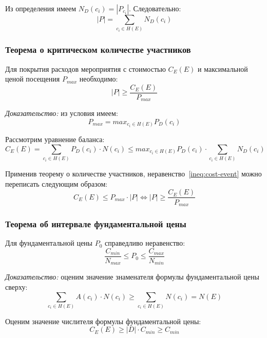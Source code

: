 Из определения имеем $N_D(c_i) = |P_{c_i}|$. Следовательно:
\begin{equation}
	|P| = \sum_{c_i \in H(E)}{N_D(c_i)}
\end{equation}

\subsubsection{Теорема о критическом количестве участников}

Для покрытия расходов мероприятия с стоимостью $C_E(E)$ и максимальной ценой посещения $P_{max}$ необходимо:
\begin{equation}
	|P| \ge \frac{C_E(E)}{P_{max}}
\end{equation}

\textit{Доказательство:} из условия имеем:
\begin{equation}
	P_{max} = max_{c_i \in H(E)}{P_D(c_i)}
\end{equation}

Рассмотрим уравнение баланса:
\begin{equation}
	C_E(E) = \sum_{c_i \in H(E)}{P_D(c_i) \cdot N(c_i)} \le max_{c_i \in H(E)}{P_D(c_i)} \cdot \sum_{c_i \in H(E)}{N_D(c_i)}
	\label{ineq:cost-event}
\end{equation}

Применив теорему о количестве участников, неравенство~\ref{ineq:cost-event} можно переписать следующим образом:
\begin{equation}
	C_E(E) \le P_{max} \cdot |P| \Leftrightarrow |P| \ge \frac{C_E(E)}{P_{max}}
\end{equation}

\subsubsection{Теорема об интервале фундаментальной цены}

Для фундаментальной цены $P_0$ справедливо неравенство:
\begin{equation}
	\frac{C_{min}}{N_{max}} \le P_0 \le \frac{C_{max}}{N_{min}}
\end{equation}

\textit{Доказательство:} оценим значение знаменателя формулы фундаментальной цены сверху:
\begin{equation}
	\sum_{c_i \in H(E)}{A(c_i) \cdot N(c_i)} \ge \sum_{c_i \in H(E)}{N(c_i)} = N(E)
\end{equation}

Оценим значение числителя формулы фундаментальной цены:
\begin{equation}
	C_E(E) \ge |D| \cdot C_{min} \ge C_{min}
\end{equation}

